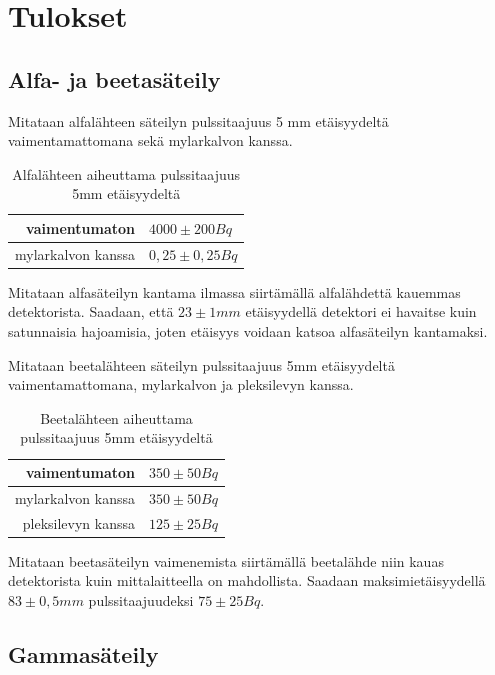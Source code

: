 \documentclass[a4paper,11pt]{article}
\begin{document}
\section{Tulokset}

\subsection{Alfa- ja beetasäteily}
\label{tulokset:alfabeeta}

Mitataan alfalähteen säteilyn pulssitaajuus 5 mm etäisyydeltä vaimentamattomana sekä mylarkalvon kanssa. 
\begin{table}[ht]
\begin{center}
\caption{Alfalähteen aiheuttama pulssitaajuus 5mm etäisyydeltä}
\begin{tabular}{ | r | l | }
  \hline 
  vaimentumaton & $4000 \pm 200 Bq$ \\ \hline
  mylarkalvon kanssa & $0,25 \pm 0,25 Bq$ \\ \hline
\end{tabular}
\end{center}
\end{table}

Mitataan alfasäteilyn kantama ilmassa siirtämällä alfalähdettä kauemmas detektorista. Saadaan, että $23 \pm 1 mm$ etäisyydellä detektori ei havaitse kuin satunnaisia hajoamisia, joten etäisyys voidaan katsoa alfasäteilyn kantamaksi. 

Mitataan beetalähteen säteilyn pulssitaajuus 5mm etäisyydeltä vaimentamattomana, mylarkalvon ja pleksilevyn kanssa.
\begin{table}[ht]
\begin{center}
\caption{Beetalähteen aiheuttama pulssitaajuus 5mm etäisyydeltä}
\begin{tabular}{ | r | l | }
  \hline
  vaimentumaton & $350 \pm 50 Bq$ \\ \hline
  mylarkalvon kanssa & $350 \pm 50 Bq$ \\ \hline
  pleksilevyn kanssa & $125 \pm 25 Bq$ \\ \hline
\end{tabular}
\end{center}
\end{table}
   
Mitataan beetasäteilyn vaimenemista siirtämällä beetalähde niin kauas detektorista kuin mittalaitteella on mahdollista. Saadaan maksimietäisyydellä $83 \pm 0,5 mm$ pulssitaajuudeksi $75 \pm 25 Bq$. 

\subsection{Gammasäteily}
\label{tulokset:gamma}
\end{document}
